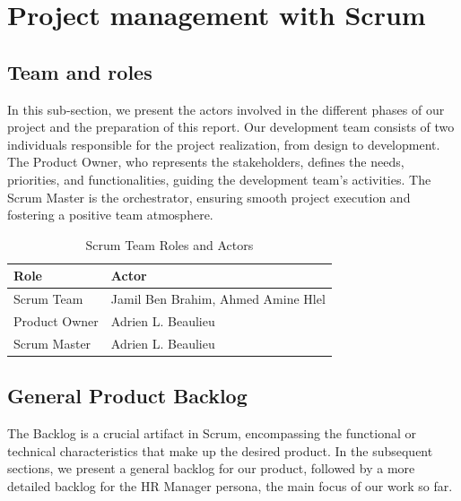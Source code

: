 \section{Project management with Scrum}
\subsection{Team and roles}
In this sub-section, we present the actors involved in the different phases of our project and the preparation of this report. Our development team consists of two individuals responsible for the project realization, from design to development. The Product Owner, who represents the stakeholders, defines the needs, priorities, and functionalities, guiding the development team's activities. The Scrum Master is the orchestrator, ensuring smooth project execution and fostering a positive team atmosphere.

\begin{table}[H]
    \renewcommand{\arraystretch}{1.5}%
    \caption{Scrum Team Roles and Actors}
    \centering
    \medskip
    \begin{tabularx}{\textwidth} {
            | >{\hsize=0.5\hsize\raggedright\arraybackslash}X
            | >{\hsize=1.5\hsize\raggedright\arraybackslash}X |}
        \hline
        \rowcolor{primary} \textbf {Role} & \textbf {Actor}                    \\
        \hline
        Scrum Team                        & Jamil Ben Brahim, Ahmed Amine Hlel \\
        \hline
        Product Owner                     & Adrien L. Beaulieu                 \\
        \hline
        Scrum Master                      & Adrien L. Beaulieu                 \\
        \hline
    \end{tabularx}
\end{table}

\subsection{General Product Backlog}
The Backlog is a crucial artifact in Scrum, encompassing the functional or technical characteristics that make up the desired product. In the subsequent sections, we present a general backlog for our product, followed by a more detailed backlog for the HR Manager persona, the main focus of our work so far.


